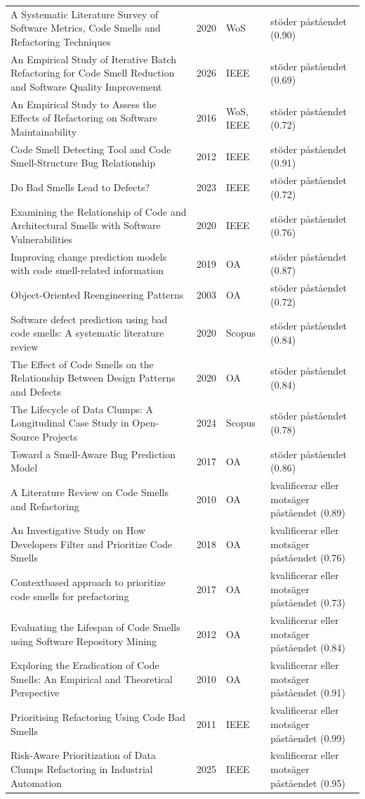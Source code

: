 \begin{longtable}{@{}%
  >{\raggedright\arraybackslash}p{}c%
  >{\raggedright\arraybackslash}p{}%
  >{\raggedright\arraybackslash}p{}@{}}
A Systematic Literature Survey of Software Metrics, Code Smells and Refactoring Techniques & 2020 & WoS & stöder påståendet (0.90) \\
An Empirical Study of Iterative Batch Refactoring for Code Smell Reduction and Software Quality Improvement & 2026 & IEEE & stöder påståendet (0.69) \\
An Empirical Study to Assess the Effects of Refactoring on Software Maintainability & 2016 & WoS, IEEE & stöder påståendet (0.72) \\
Code Smell Detecting Tool and Code Smell-Structure Bug Relationship & 2012 & IEEE & stöder påståendet (0.91) \\
Do Bad Smells Lead to Defects? & 2023 & IEEE & stöder påståendet (0.72) \\
Examining the Relationship of Code and Architectural Smells with Software Vulnerabilities & 2020 & IEEE & stöder påståendet (0.76) \\
Improving change prediction models with code smell-related information & 2019 & OA & stöder påståendet (0.87) \\
Object-Oriented Reengineering Patterns & 2003 & OA & stöder påståendet (0.72) \\
Software defect prediction using bad code smells: A systematic literature review & 2020 & Scopus & stöder påståendet (0.84) \\
The Effect of Code Smells on the Relationship Between Design Patterns and Defects & 2020 & OA & stöder påståendet (0.84) \\
The Lifecycle of Data Clumps: A Longitudinal Case Study in Open-Source Projects & 2024 & Scopus & stöder påståendet (0.78) \\
Toward a Smell-Aware Bug Prediction Model & 2017 & OA & stöder påståendet (0.86) \\
A Literature Review on Code Smells and Refactoring & 2010 & OA & kvalificerar eller motsäger påståendet (0.89) \\
An Investigative Study on How Developers Filter and Prioritize Code Smells & 2018 & OA & kvalificerar eller motsäger påståendet (0.76) \\
Contextbased approach to prioritize code smells for prefactoring & 2017 & OA & kvalificerar eller motsäger påståendet (0.73) \\
Evaluating the Lifespan of Code Smells using Software Repository Mining & 2012 & OA & kvalificerar eller motsäger påståendet (0.84) \\
Exploring the Eradication of Code Smells: An Empirical and Theoretical Perspective & 2010 & OA & kvalificerar eller motsäger påståendet (0.91) \\
Prioritising Refactoring Using Code Bad Smells & 2011 & IEEE & kvalificerar eller motsäger påståendet (0.99) \\
Risk-Aware Prioritization of Data Clumps Refactoring in Industrial Automation & 2025 & IEEE & kvalificerar eller motsäger påståendet (0.95) \\
\end{longtable}
\endgroup
